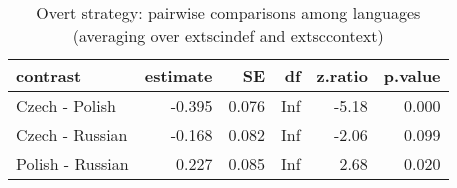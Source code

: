 \begin{table}[!h]
\centering
\caption{Overt strategy: pairwise comparisons among languages (averaging over 	extsc{indef} and 	extsc{context})}
\centering
\begin{tabular}[t]{lrrrrr}
\toprule
contrast & estimate & SE & df & z.ratio & p.value\\
\midrule
Czech - Polish & -0.395 & 0.076 & Inf & -5.18 & 0.000\\
Czech - Russian & -0.168 & 0.082 & Inf & -2.06 & 0.099\\
Polish - Russian & 0.227 & 0.085 & Inf & 2.68 & 0.020\\
\bottomrule
\end{tabular}
\end{table}
